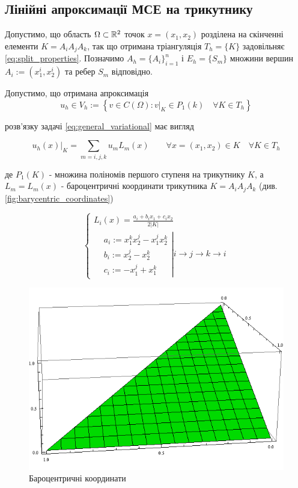 \subsection{Лінійні апроксимації МСЕ на трикутнику}

Допустимо, що область $\Omega \subset \mathbb{R}^2$ точок $x = (x_1, x_2)$ розділена на скінченні елементи $K = A_iA_jA_k$,
	так що отримана тріангуляція $T_h = \lbrace K \rbrace$ задовільняє
\eqref{eq:split_properties}.
Позначимо $A_h = \lbrace A_i \rbrace_{i=1}^n$ і $E_h = \lbrace S_m \rbrace$ множини вершин $A_i := (x_1^i, x_2^i)$ та ребер $S_m$ відповідно.

Допустимо, що отримана апроксимація
\begin{equation}
	u_h \in V_h := \left\lbrace v \in C(\Omega) : v|_K \in P_1(k) \quad \forall K \in T_h \right\rbrace
\end{equation}

розв'язку задачі
\eqref{eq:general_variational} має вигляд

\begin{equation}
	u_h(x)|_K = \sum \limits_{m=i,j,k} u_m L_m (x) \qquad \forall x=(x_1, x_2) \in K \quad \forall K \in T_h
\end{equation}

де $P_1(K)$ - множина поліномів першого ступеня на трикутнику $K$, а $L_m = L_m(x)$ -
	бароцентричні координати трикутника $K = A_i A_j A_k$ (див. \autoref{fig:barycentric_coordinates})

\begin{equation}\label{eq:barycentric_coord}
	\begin{cases}
		L_i(x) = \frac{a_i + b_i x_1 + c_i x_2}{2 |K|} \\
			\left.
			\begin{split}
				&a_i := x_1^k x_2^j - x_1^j x_2^k \\
				&b_i := x_2^j -x_2^k \\
				&c_i := -x_1^j+x_1^k
			\end{split}
			\right|
			i \to j \to k \to i
	\end{cases}
\end{equation}

\begin{figure}[H]
	\centering
    \includegraphics[scale=0.5]{images/barycentric}
    \caption{Бароцентричні координати}%
    \label{fig:barycentric_coordinates}
\end{figure}
